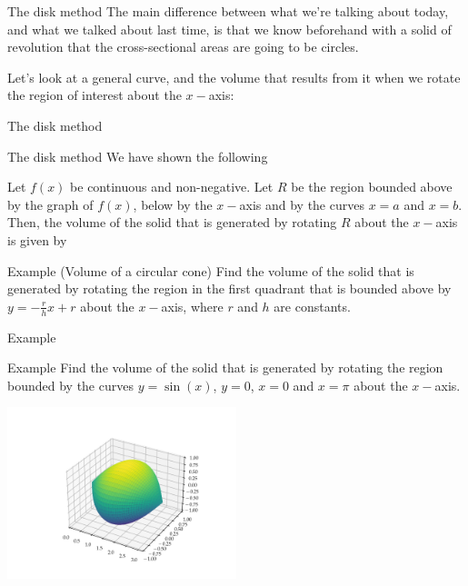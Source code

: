 \documentclass[presentation]{beamer}
\begin{document}
\begin{frame}[label={sec:org36a554d}]{The disk method}
The main difference between what we're talking about today, and what
we talked about last time, is that we know beforehand with a solid of
revolution that the cross-sectional areas are going to be circles.

Let's look at a general curve, and the volume that results from it
when we rotate the region of interest about the \(x-\)axis:
\vspace{10in}
\end{frame}

\begin{frame}[label={sec:orgeb53302}]{The disk method}
\end{frame}

\begin{frame}[label={sec:orgdf17af4}]{The disk method}
We have shown the following
\begin{theorem}
Let \(f \left( x \right)\) be continuous and non-negative.  Let \(R\) be the region bounded above by the graph of \(f \left( x \right)\), below by the \(x-\)axis and by the curves \(x = a\) and \(x=b\).  Then, the volume of the solid that is generated by rotating \(R\) about the \(x-\)axis is given by
\[
\, \]
\phantom{butts}

\phantom{butts}
\end{theorem}
\end{frame}


\begin{frame}[label={sec:org46f8fa8}]{Example (Volume of a circular cone)}
Find the volume of the solid that is generated by rotating the region
in the first quadrant that is bounded above by \(y = -\frac{r}{h}x + r\)
about the \(x-\)axis, where \(r\) and \(h\) are constants.
\vspace{10in}
\end{frame}

\begin{frame}[label={sec:org418afcd}]{Example}
\end{frame}

\begin{frame}[label={sec:orga1943e0}]{Example}
Find the volume of the solid that is generated by rotating the region
bounded by the curves \(y = \sin \left( x \right)\), \(y = 0\), \(x
= 0\) and \(x = \pi\) about the \(x-\)axis.

\begin{center}
\includegraphics[width=0.5\textwidth]{../img/day006-ex01.png}
\end{center}
\vspace{10in}
\end{frame}
\end{document}
